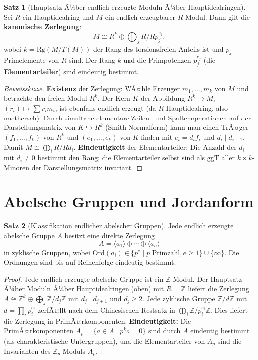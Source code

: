 ﻿\documentclass[a4paper,12pt]{report}
\theoremstyle{definition}
\newtheorem{satz}{Satz}
\begin{document}
\begin{satz}[Hauptsatz Ã¼ber endlich erzeugte Moduln Ã¼ber Hauptidealringen]
    Sei $R$ ein Hauptidealring und $M$ ein endlich erzeugbarer $R$-Modul.
    Dann gilt die \textbf{kanonische Zerlegung}:
    \[
        M \cong R^k \oplus \bigoplus_{j} R/R p_j^{e_j},
    \]
    wobei $k = \mathrm{Rg}(M/T(M))$ der Rang des torsionsfreien Anteils
    ist und $p_j$ Primelemente von $R$ sind. Der Rang $k$ und die
    Primpotenzen $p_j^{e_j}$ (die \textbf{Elementarteiler}) sind
    eindeutig bestimmt.
\end{satz}
\begin{proof}[Beweisskizze]
    \textbf{Existenz} der Zerlegung: WÃ¤hle Erzeuger $m_1, \ldots, m_k$ von $M$
    und betrachte den freien Modul $R^k$. Der Kern $K$ der Abbildung
    $R^k \to M$, $(r_i) \mapsto \sum r_i m_i$, ist ebenfalls endlich erzeugt
    (da $R$ Hauptidealring, also noethersch). Durch simultane elementare Zeilen-
    und Spaltenoperationen auf der Darstellungsmatrix von $K \hookrightarrow R^k$
    (Smith-Normalform) kann man einen TrÃ¤ger $(f_1, \ldots, f_k)$ von $R^k$ und
    $(e_1, \ldots, e_k)$ von $K$ finden mit $e_i = d_i f_i$ und $d_i \mid d_{i+1}$.
    Damit $M \cong \bigoplus_{i} R/Rd_i$.
    \textbf{Eindeutigkeit} der Elementarteiler: Die Anzahl der $d_i$ mit $d_i \neq 0$
    bestimmt den Rang; die Elementarteiler selbst sind als $\mathrm{ggT}$
    aller $k \times k$-Minoren der Darstellungsmatrix invariant.
\end{proof}

\section{Abelsche Gruppen und Jordanform}

\begin{satz}[Klassifikation endlicher abelscher Gruppen]
    Jede endlich erzeugte abelsche Gruppe $A$ besitzt eine direkte
    Zerlegung
    \[
        A = \langle a_1 \rangle \oplus \cdots \oplus \langle a_n \rangle
    \]
    in zyklische Gruppen, wobei $\mathrm{Ord}(a_i) \in \{p^e \mid p
    \text{ Primzahl}, e \geq 1\} \cup \{\infty\}$. Die Ordnungen sind
    bis auf Reihenfolge eindeutig bestimmt.
\end{satz}
\begin{proof}
    Jede endlich erzeugte abelsche Gruppe ist ein $\mathbb{Z}$-Modul.
    Der Hauptsatz Ã¼ber Moduln Ã¼ber Hauptidealringen (oben) mit $R = \mathbb{Z}$
    liefert die Zerlegung $A \cong \mathbb{Z}^k \oplus \bigoplus_j \mathbb{Z}/d_j\mathbb{Z}$
    mit $d_j \mid d_{j+1}$ und $d_j \geq 2$.
    Jede zyklische Gruppe $\mathbb{Z}/d\mathbb{Z}$ mit $d = \prod_i p_i^{e_i}$
    zerfÃ¤llt nach dem Chinesischen Restsatz in $\bigoplus_i \mathbb{Z}/p_i^{e_i}\mathbb{Z}$.
    Dies liefert die Zerlegung in PrimÃ¤rkomponenten.
    \textbf{Eindeutigkeit:} Die PrimÃ¤rkomponenten $A_p = \{a \in A \mid p^k a = 0\}$
    sind durch $A$ eindeutig bestimmt (als charakteristische Untergruppen),
    und die Elementarteiler von $A_p$ sind die Invarianten des $\mathbb{Z}_p$-Moduls $A_p$.
\end{proof}
\end{document}

